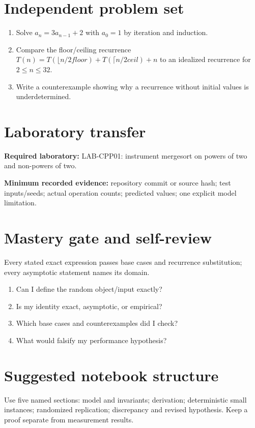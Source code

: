 \documentclass[11pt]{article}
\begin{document}
\section{Independent problem set}
\begin{enumerate}
\item Solve $a_n=3a_{n-1}+2$ with $a_0=1$ by iteration and induction.
\item Compare the floor/ceiling recurrence $T(n)=T(\lfloor n/2
floor)+T(\lceil n/2
ceil)+n$ to an idealized recurrence for $2\le n\le32$.
\item Write a counterexample showing why a recurrence without initial values is underdetermined.
\end{enumerate}
\section{Laboratory transfer}
\textbf{Required laboratory:} LAB-CPP01: instrument mergesort on powers of two and non-powers of two.\par
\noindent\textbf{Minimum recorded evidence:} repository commit or source hash; test inputs/seeds; actual operation counts; predicted values; one explicit model limitation.\par
\section{Mastery gate and self-review}
Every stated exact expression passes base cases and recurrence substitution; every asymptotic statement names its domain.\par
\begin{enumerate}\item Can I define the random object/input exactly? \item Is my identity exact, asymptotic, or empirical? \item Which base cases and counterexamples did I check? \item What would falsify my performance hypothesis?\end{enumerate}
\section{Suggested notebook structure}
Use five named sections: model and invariants; derivation; deterministic small instances; randomized replication; discrepancy and revised hypothesis. Keep a proof separate from measurement results.
\end{document}
